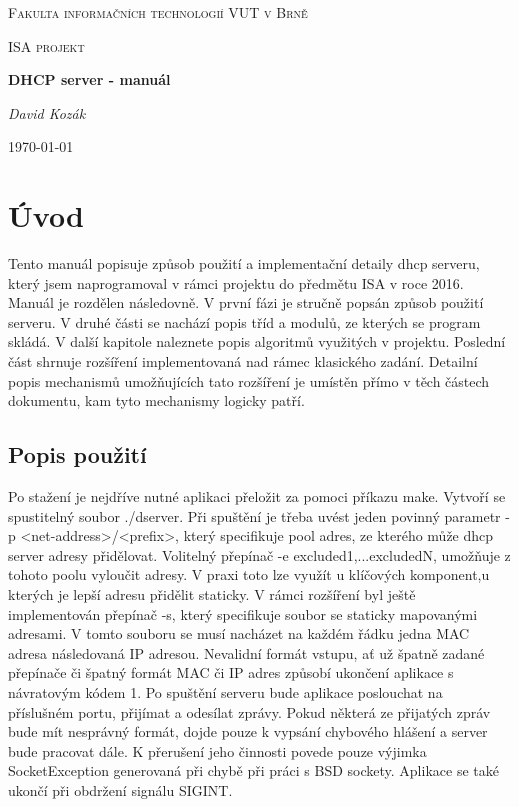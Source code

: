\documentclass[12pt,a4paper]{report}
\begin{document}
\begin{titlepage}
	\centering
	{\scshape\LARGE Fakulta informačních technologií VUT v Brně \par}
	\vspace{1cm}
	{\scshape\Large ISA projekt \par}
	\vspace{1.5cm}
	{\huge\bfseries DHCP server - manuál\par}
	\vspace{2cm}
	{\Large\itshape David Kozák\par}
	\vfill
	\vfill

	{\large \today\par}
\end{titlepage}

\tableofcontents
\newpage

\chapter{Úvod}

Tento manuál popisuje způsob použití a implementační detaily dhcp serveru, který jsem naprogramoval v rámci projektu do předmětu ISA v roce 2016.  Manuál je rozdělen následovně. V první fázi je stručně popsán způsob použití serveru.
V druhé části se nachází popis tříd a modulů, ze kterých se program skládá.
V další kapitole naleznete popis algoritmů využitých v projektu.
Poslední část shrnuje rozšíření implementovaná nad rámec klasického zadání. Detailní popis mechanismů umožňujících tato rozšíření je umístěn přímo v těch částech dokumentu, kam tyto mechanismy logicky patří.
\section{Popis použití}
Po stažení je nejdříve nutné aplikaci přeložit za pomoci příkazu make. Vytvoří se spustitelný soubor ./dserver. Při spuštění je třeba uvést jeden povinný parametr -p <net-address>/<prefix>,
který specifikuje pool adres, ze kterého může dhcp server adresy přidělovat. Volitelný přepínač -e excluded1,...excludedN, umožňuje z tohoto poolu vyloučit adresy. V praxi toto lze využít u klíčových komponent,u kterých je lepší adresu přidělit staticky. V rámci rozšíření byl ještě implementován přepínač -s, který specifikuje soubor se staticky mapovanými adresami. V tomto souboru se musí nacházet na každém řádku jedna MAC adresa následovaná IP adresou. Nevalidní formát vstupu, ať už špatně zadané přepínače či špatný formát MAC či IP adres způsobí ukončení aplikace s návratovým kódem 1.
Po spuštění serveru bude aplikace poslouchat na příslušném portu, přijímat a odesílat zprávy. Pokud některá ze přijatých zpráv bude mít nesprávný formát, dojde pouze k vypsání chybového hlášení a server bude pracovat dále. K přerušení jeho činnosti povede pouze výjimka SocketException generovaná při chybě při práci s BSD sockety. Aplikace se také ukončí při obdržení signálu SIGINT.
\end{document}

